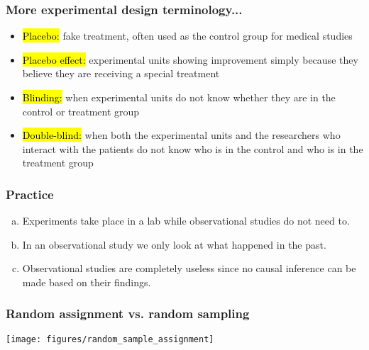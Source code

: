 \begin{frame}
\frametitle{More experimental design terminology...}

\begin{itemize}

\item \hl{Placebo:} fake treatment, often used as the control group for medical studies

\item \hl{Placebo effect:} experimental units showing improvement simply because they believe they are receiving a special treatment

\item \hl{Blinding:} when experimental units do not know whether they are in the control or treatment group

\item \hl{Double-blind:} when both the experimental units and the researchers who interact with the patients do not know who is in the control and who is in the treatment group

\end{itemize}

\end{frame}


\begin{frame}
\frametitle{Practice}


\begin{enumerate}[(a)]
\item Experiments take place in a lab while observational studies do not need to.
\item In an observational study we only look at what happened in the past.
\item Observational studies are completely useless since no causal inference can be made based on their findings.
\end{enumerate}

\end{frame}


\begin{frame}
\frametitle{Random assignment vs. random sampling}

\begin{center}
\texttt{[image: figures/random\_sample\_assignment]}
\end{center}

\end{frame}

